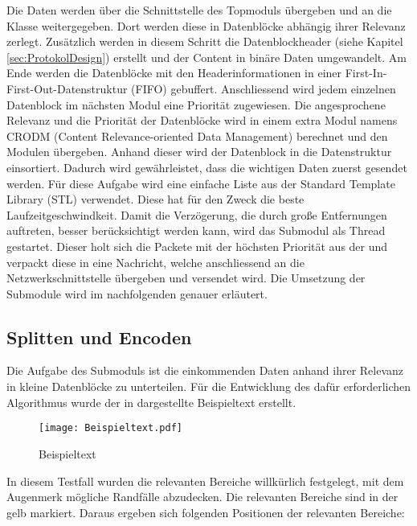 Die Daten werden über die Schnittstelle des Topmoduls übergeben und an die
Klasse  weitergegeben. Dort werden diese in Datenblöcke
abhängig ihrer Relevanz zerlegt. Zusätzlich werden in diesem Schritt die
Datenblockheader (siehe Kapitel \ref{sec:ProtokolDesign}) erstellt und der
Content in binäre Daten umgewandelt. Am Ende werden die Datenblöcke mit den
Headerinformationen in einer First-In-First-Out-Datenstruktur (FIFO)
gebuffert.
Anschliessend wird jedem einzelnen Datenblock im nächsten Modul eine Priorität zugewiesen. Die angesprochene
Relevanz und die Priorität der Datenblöcke wird in einem extra Modul namens
CRODM (Content Relevance-oriented Data Management)
berechnet und den Modulen übergeben.
Anhand dieser wird der Datenblock in die Datenstruktur
 einsortiert. Dadurch wird
gewährleistet, dass die wichtigen Daten zuerst gesendet werden. Für diese
Aufgabe wird eine einfache Liste aus der Standard Template Library (STL) verwendet.
Diese hat für den Zweck die beste Laufzeitgeschwindkeit.
Damit die Verzögerung, die durch große Entfernungen auftreten, besser
berücksichtigt werden kann, wird das Submodul  als Thread
gestartet.
Dieser holt sich die Packete mit der höchsten Priorität aus der
 und verpackt diese in eine Nachricht, welche
anschliessend an die Netzwerkschnittstelle übergeben und versendet wird. \newline
Die Umsetzung der Submodule wird im nachfolgenden genauer erläutert.

\subsection{Splitten und Encoden}

Die Aufgabe des Submoduls  ist die einkommenden Daten
anhand ihrer Relevanz in kleine Datenblöcke zu unterteilen. Für die Entwicklung
des dafür erforderlichen Algorithmus wurde der in 
dargestellte Beispieltext erstellt.

\begin{figure}[H]
\centering
\texttt{[image: Beispieltext.pdf]}
\caption{Beispieltext}
\label{fig:Beispieltext}
\end{figure}

In diesem Testfall wurden die relevanten Bereiche willkürlich festgelegt, mit
dem Augenmerk mögliche Randfälle abzudecken. Die relevanten Bereiche sind in
der  gelb markiert.\newline
Daraus ergeben sich folgenden Positionen der relevanten Bereiche:

